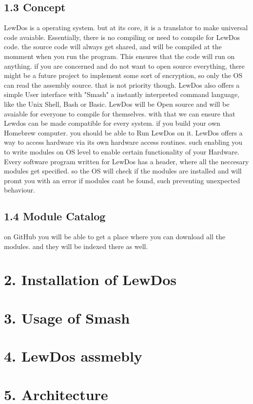 \documentclass[12pt, letterpaper]{article}
\begin{document}
\subsection*{1.3 Concept}
LewDos is a operating system. but at its core, it is a translator to make universal code avaiable. Essentially, there is no compiling or need to compile for LewDos code.
the source code will always get shared, and will be compiled at the momment when you run the program. This ensures that the code will run on anything. if you are concerned and do not want
to open source everything, there might be a future project to implement some sort of encryption, so only the OS can read the assembly source. that is not priority though.
LewDos also offers a simple User interface with "Smash" a instantly interpreted command language, like the Unix Shell, Bash or Basic. LewDos will be Open source and will be avaiable for 
everyone to compile for themselves. with that we can ensure that Lewdos can be made compatible for every system. if you build your own Homebrew computer. you should be able to Run LewDos on it.
LewDos offers a way to access hardware via its own hardware access routines. such enabling you to write modules on OS level to enable certain functionality of your Hardware.
Every software program written for LewDos has a header, where all the neccesary modules get specified. so the OS will check if the modules are installed and will promt you with an error
if modules cant be found, such preventing unexpected behaviour.
\subsection*{1.4 Module Catalog}
on GitHub you will be able to get a place where you can download all the modules. and they will be indexed there as well.
\newpage
\section*{2. Installation of LewDos}
\section*{3. Usage of Smash}
\section*{4. LewDos assmebly}
\section*{5. Architecture}
\end{document}
